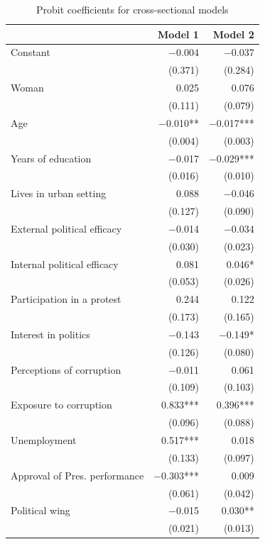 \documentclass[floatsintext,man]{apa7}\usepackage[]{graphicx}\usepackage[]{color}
\begin{document}
\begin{longtable}[t]{lrr}
\caption{\label{tab:complexmodcprob}Probit coefficients for cross-sectional models}\\
\toprule
  & Model 1 & Model 2\\
\midrule
Constant & \num{-0.004} & \num{-0.037}\\
 & (\num{0.371}) & (\num{0.284})\\
Woman & \num{0.025} & \num{0.076}\\
 & (\num{0.111}) & (\num{0.079})\\
Age & \num{-0.010}** & \num{-0.017}***\\
 & (\num{0.004}) & (\num{0.003})\\
Years of education & \num{-0.017} & \num{-0.029}***\\
 & (\num{0.016}) & (\num{0.010})\\
Lives in urban setting & \num{0.088} & \num{-0.046}\\
 & (\num{0.127}) & (\num{0.090})\\
External political efficacy & \num{-0.014} & \num{-0.034}\\
 & (\num{0.030}) & (\num{0.023})\\
Internal political efficacy & \num{0.081} & \num{0.046}*\\
 & (\num{0.053}) & (\num{0.026})\\
Participation in a protest & \num{0.244} & \num{0.122}\\
 & (\num{0.173}) & (\num{0.165})\\
Interest in politics & \num{-0.143} & \num{-0.149}*\\
 & (\num{0.126}) & (\num{0.080})\\
Perceptions of corruption & \num{-0.011} & \num{0.061}\\
 & (\num{0.109}) & (\num{0.103})\\
Exposure to corruption & \num{0.833}*** & \num{0.396}***\\
 & (\num{0.096}) & (\num{0.088})\\
Unemployment & \num{0.517}*** & \num{0.018}\\
 & (\num{0.133}) & (\num{0.097})\\
Approval of Pres. performance & \num{-0.303}*** & \num{0.009}\\
 & (\num{0.061}) & (\num{0.042})\\
Political wing & \num{-0.015} & \num{0.030}**\\
 & (\num{0.021}) & (\num{0.013})\\

\end{longtable}
\end{document}

